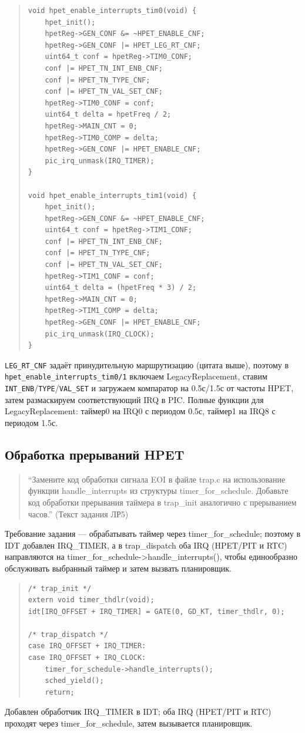\documentclass[a4paper,12pt]{article}
\begin{document}
\begin{quote}\begin{verbatim}
void hpet_enable_interrupts_tim0(void) {
    hpet_init();
    hpetReg->GEN_CONF &= ~HPET_ENABLE_CNF;
    hpetReg->GEN_CONF |= HPET_LEG_RT_CNF;
    uint64_t conf = hpetReg->TIM0_CONF;
    conf |= HPET_TN_INT_ENB_CNF;
    conf |= HPET_TN_TYPE_CNF;
    conf |= HPET_TN_VAL_SET_CNF;
    hpetReg->TIM0_CONF = conf;
    uint64_t delta = hpetFreq / 2;
    hpetReg->MAIN_CNT = 0;
    hpetReg->TIM0_COMP = delta;
    hpetReg->GEN_CONF |= HPET_ENABLE_CNF;
    pic_irq_unmask(IRQ_TIMER);
}

void hpet_enable_interrupts_tim1(void) {
    hpet_init();
    hpetReg->GEN_CONF &= ~HPET_ENABLE_CNF;
    uint64_t conf = hpetReg->TIM1_CONF;
    conf |= HPET_TN_INT_ENB_CNF;
    conf |= HPET_TN_TYPE_CNF;
    conf |= HPET_TN_VAL_SET_CNF;
    hpetReg->TIM1_CONF = conf;
    uint64_t delta = (hpetFreq * 3) / 2;
    hpetReg->MAIN_CNT = 0;
    hpetReg->TIM1_COMP = delta;
    hpetReg->GEN_CONF |= HPET_ENABLE_CNF;
    pic_irq_unmask(IRQ_CLOCK);
}
\end{verbatim}\end{quote}
\texttt{LEG\_RT\_CNF} задаёт принудительную маршрутизацию (цитата выше), поэтому в \texttt{hpet\_enable\_interrupts\_tim0/1} включаем LegacyReplacement, ставим \texttt{INT\_ENB}/\texttt{TYPE}/\texttt{VAL\_SET} и загружаем компаратор на 0.5с/1.5с от частоты HPET, затем размаскируем соответствующий IRQ в PIC.
Полные функции для LegacyReplacement: таймер0 на IRQ0 с периодом 0.5с, таймер1 на IRQ8 с периодом 1.5с.



\subsection{Обработка прерываний HPET}
\begin{quote}
``Замените код обработки сигнала EOI в файле trap.c на использование функции handle_interrupts из структуры timer_for_schedule. Добавьте код обработки прерывания таймера в trap_init аналогично с прерыванием часов.'' (Текст задания ЛР5)
\end{quote}
Требование задания — обрабатывать таймер через timer\_for\_schedule; поэтому в IDT добавлен IRQ\_TIMER, а в trap\_dispatch оба IRQ (HPET/PIT и RTC) направляются на timer\_for\_schedule->handle\_interrupts(), чтобы единообразно обслуживать выбранный таймер и затем вызвать планировщик.
\begin{quote}\begin{verbatim}
/* trap_init */
extern void timer_thdlr(void);
idt[IRQ_OFFSET + IRQ_TIMER] = GATE(0, GD_KT, timer_thdlr, 0);

/* trap_dispatch */
case IRQ_OFFSET + IRQ_TIMER:
case IRQ_OFFSET + IRQ_CLOCK:
    timer_for_schedule->handle_interrupts();
    sched_yield();
    return;
\end{verbatim}\end{quote}
Добавлен обработчик IRQ\_TIMER в IDT; оба IRQ (HPET/PIT и RTC) проходят через timer\_for\_schedule, затем вызывается планировщик.
\end{document}
